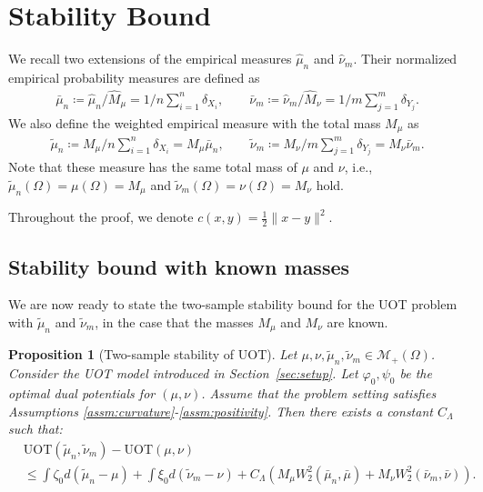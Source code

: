 \documentclass[11pt,reqno]{amsart}
\newtheorem{proposition}[theorem]{Proposition}
\theoremstyle{definition}
\newcommand{\R}{\mathbb{R}}
\newcommand{\KL}{\mathrm{KL}}
\renewcommand{\hat}{\widehat}
\renewcommand{\tilde}{\widetilde}
\begin{document}
\section{Stability Bound}

We recall two extensions of the empirical measures $\hat{\mu}_n$ and $\hat{\nu}_m$.
Their normalized empirical probability measures are defined as
\begin{align}
    \bar\mu_n \coloneqq {\hat\mu_n/\hat M_\mu} = {1/n}\sum_{i=1}^n \delta_{X_i}, \qquad \bar\nu_m \coloneqq {\hat\nu_m/\hat M_\nu} = {1/m}\sum_{j=1}^m \delta_{Y_j}.
\end{align}
We also define the weighted empirical measure with the total mass $M_\mu$ as
\begin{align}
    \tilde\mu_n \coloneqq {M_\mu/n}\sum_{i=1}^n \delta_{X_i} = M_\mu\bar\mu_n, \qquad \tilde\nu_m \coloneqq {M_\nu/m}\sum_{j=1}^m \delta_{Y_j} = M_\nu\bar\nu_m.
\end{align}
Note that these measure has the same total mass of $\mu$ and $\nu$, i.e., $\tilde\mu_n(\Omega) = \mu(\Omega) = M_\mu$ and $\tilde\nu_m(\Omega) = \nu(\Omega) = M_\nu$ hold.

Throughout the proof, we denote $c(x,y) = \tfrac{1}{2} \| x - y \|^2$.




\subsection{Stability bound with known masses}


We are now ready to state the two-sample stability bound for the UOT problem  with $\tilde\mu_n$ and $\tilde\nu_m$, in the case that the masses $M_\mu$ and $M_\nu$ are known.
\begin{proposition}[Two-sample stability of $\mathrm{UOT}$]
\label{prop:two_sample_stability}
Let $\mu, \nu, \tilde\mu_n, \tilde\nu_m \in \mathcal{M}_+(\Omega)$. {Consider the UOT model introduced in Section~\ref{sec:setup}.} Let $\varphi_0, \psi_0$ be the optimal dual potentials for $(\mu,\nu)$. Assume that the problem setting satisfies Assumptions \ref{assm:curvature}-\ref{assm:positivity}. Then there exists a constant $C_\Lambda$ such that:
\begin{align}
\label{eq:uot_two_sample}
&\mathrm{UOT}(\tilde\mu_n, \tilde\nu_m) - \mathrm{UOT}(\mu, \nu) \\
&\leq \int \zeta_0 d(\tilde\mu_n - \mu) + \int \xi_0 d(\tilde\nu_m - \nu) + C_\Lambda \left( M_\mu W_2^2(\bar\mu_n, \bar\mu) + M_\nu W_2^2(\bar\nu_m, \bar\nu) \right).
\end{align}
\end{proposition}
\end{document}
